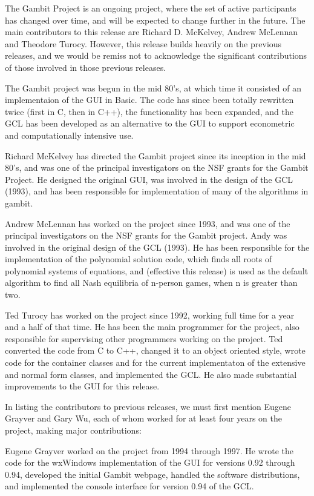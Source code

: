 \documentclass[12pt]{report}
\begin{document}
The Gambit Project is an ongoing project, where the set of active
participants has changed over time, and will be expected to change
further in the future.  The main contributors to this release are
Richard D. McKelvey, Andrew McLennan and Theodore Turocy.  However, this
release builds heavily on the previous releases, and we would be
remiss not to acknowledge the significant contributions of those
involved in those previous releases.

The Gambit project was begun in the mid 80's, at which time it
consisted of an implementaion of the GUI in Basic.  The code has since
been totally rewritten twice (first in C, then in C++), the
functionality has been expanded, and the GCL has been developed as an
alternative to the GUI to support econometric and computationally
intensive use.

Richard McKelvey has directed the Gambit project since its inception
in the mid 80's, and was one of the principal investigators on the NSF
grants for the Gambit Project.  He designed the original GUI, was
involved in the design of the GCL (1993), and has been responsible for
implementation of many of the algorithms in gambit.

Andrew McLennan has worked on the project since 1993, and was one of
the principal investigators on the NSF grants for the Gambit project.
Andy was involved in the original design of the GCL (1993).  He has
been responsible for the implementation of the polynomial solution
code, which finds all roots of polynomial systems of equations, and
(effective this release) is used as the default algorithm to find all
Nash equilibria of n-person games, when n is greater than two.

Ted Turocy has worked on the project since 1992, working full time for
a year and a half of that time.  He has been the main programmer for
the project, also responsible for supervising other programmers
working on the project.  Ted converted the code from C to C++, changed
it to an object oriented style, wrote code for the container classes
and for the current implementaton of the extensive and normal form
classes, and implemented the GCL.  He also made substantial
improvements to the GUI for this release.

In listing the contributors to previous releases, we must
first mention Eugene Grayver and Gary Wu, each of whom worked
for at least four years on the project, making major contributions:

Eugene Grayver worked on the project from 1994 through 1997.
He wrote the code for the wxWindows implementation of the GUI for versions
0.92 through 0.94, developed the initial Gambit webpage, handled the software
distributions, and implemented the console interface for version 0.94
of the GCL.
\end{document}
